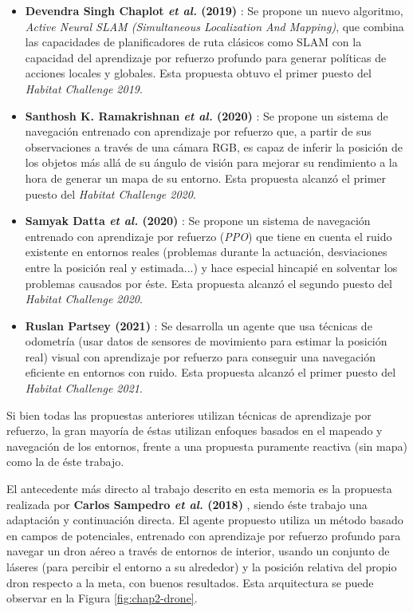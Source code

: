\begin{itemize}
	\item \textbf{Devendra Singh Chaplot \textit{et al.} (2019)} \cite{DBLP:journals/corr/abs-2004-05155}: Se propone un nuevo algoritmo, \textit{Active Neural SLAM (Simultaneous Localization And Mapping)}, que combina las capacidades de planificadores de ruta clásicos como SLAM con la capacidad del aprendizaje por refuerzo profundo para generar políticas de acciones locales y globales. Esta propuesta obtuvo el primer puesto del \textit{Habitat Challenge 2019}.
	\item \textbf{Santhosh K. Ramakrishnan \textit{et al.} (2020)} \cite{DBLP:journals/corr/abs-2008-09285}: Se propone un sistema de navegación entrenado con aprendizaje por refuerzo que, a partir de sus observaciones a través de una cámara RGB, es capaz de inferir la posición de los objetos más allá de su ángulo de visión para mejorar su rendimiento a la hora de generar un mapa de su entorno. Esta propuesta alcanzó el primer puesto del \textit{Habitat Challenge 2020}.
	 \item \textbf{Samyak Datta \textit{et al.} (2020)} \cite{DBLP:journals/corr/abs-2009-03231}: Se propone un sistema de navegación entrenado con aprendizaje por refuerzo (\textit{PPO}) que tiene en cuenta el ruido existente en entornos reales (problemas durante la actuación, desviaciones entre la posición real y estimada...) y hace especial hincapié en solventar los problemas causados por éste. Esta propuesta alcanzó el segundo puesto del \textit{Habitat Challenge 2020}.
	 \item \textbf{Ruslan Partsey (2021)} \cite{Partsey2021}: Se desarrolla un agente que usa técnicas de odometría (usar datos de sensores de movimiento para estimar la posición real) visual con aprendizaje por refuerzo para conseguir una navegación eficiente en entornos con ruido. Esta propuesta alcanzó el primer puesto del \textit{Habitat Challenge 2021}.
\end{itemize}

Si bien todas las propuestas anteriores utilizan técnicas de aprendizaje por refuerzo, la gran mayoría de éstas utilizan enfoques basados en el mapeado y navegación de los entornos, frente a una propuesta puramente reactiva (sin mapa) como la de éste trabajo.

El antecedente más directo al trabajo descrito en esta memoria es la propuesta realizada por \textbf{Carlos Sampedro \textit{et al.} (2018)} \cite{Sampedro2018}, siendo éste trabajo una adaptación y continuación directa. El agente propuesto utiliza un método basado en campos de potenciales, entrenado con aprendizaje por refuerzo profundo para navegar un dron aéreo a través de entornos de interior, usando un conjunto de láseres (para percibir el entorno a su alrededor) y la posición relativa del propio dron respecto a la meta, con buenos resultados. Esta arquitectura se puede observar en la Figura \ref{fig:chap2-drone}.

